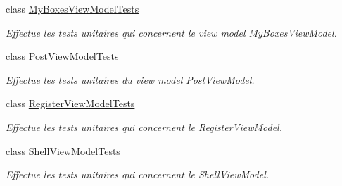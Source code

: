\begin{DoxyCompactItemize}
class \hyperlink{class_boxes_1_1_tests_1_1_my_boxes_view_model_tests}{My\+Boxes\+View\+Model\+Tests}
\begin{DoxyCompactList}\small\item\em Effectue les tests unitaires qui concernent le view model My\+Boxes\+View\+Model. \end{DoxyCompactList}\item 
class \hyperlink{class_boxes_1_1_tests_1_1_post_view_model_tests}{Post\+View\+Model\+Tests}
\begin{DoxyCompactList}\small\item\em Effectue les tests unitaires du view model Post\+View\+Model. \end{DoxyCompactList}\item 
class \hyperlink{class_boxes_1_1_tests_1_1_register_view_model_tests}{Register\+View\+Model\+Tests}
\begin{DoxyCompactList}\small\item\em Effectue les tests unitaires qui concernent le Register\+View\+Model. \end{DoxyCompactList}\item 
class \hyperlink{class_boxes_1_1_tests_1_1_shell_view_model_tests}{Shell\+View\+Model\+Tests}
\begin{DoxyCompactList}\small\item\em Effectue les tests unitaires qui concernent le Shell\+View\+Model. \end{DoxyCompactList}\end{DoxyCompactItemize}

